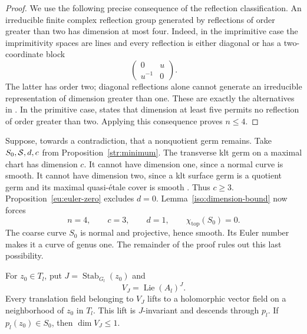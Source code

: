 \begin{proof}
We use the following precise consequence of the reflection
classification.  An irreducible finite complex reflection group
generated by reflections of order greater than two has dimension
at most four.  Indeed, in the imprimitive case the imprimitivity
spaces are lines and every reflection is either diagonal or has
a two-coordinate block
\[
                       \begin{pmatrix}0&u\\u^{-1}&0\end{pmatrix}.
\]
The latter has order two; diagonal reflections alone cannot generate
an irreducible representation of dimension greater than one.
These are exactly the alternatives in
\cite[\S2, pp.~276--277]{ShephardTodd1954}.
In the primitive case,
\cite[Proposition~(5.9)(iii), p.~430]{Cohen1976}
states that dimension at least five permits no reflection of
order greater than two.  Applying this consequence proves \(n\le4\).
\end{proof}

Suppose, towards a contradiction, that a nonquotient germ remains.
Take \(S_0,\mathcal S,d,c\) from Proposition~\ref{str:minimum}.
The transverse klt germ on a maximal chart has dimension \(c\).
It cannot have dimension one, since a normal curve is smooth.
It cannot have dimension two, since a klt surface germ is a quotient
germ and its maximal quasi-\'etale cover is smooth
\cite[Proposition~(6.11)]{ClemensKollarMori1988}.
Thus \(c\ge3\).
Proposition~\ref{eu:euler-zero} excludes \(d=0\).
Lemma~\ref{iso:dimension-bound} now forces
\begin{equation}\label{iso:elliptic-case}
              n=4,\qquad c=3,\qquad d=1,\qquad
              \chi_{\mathrm{top}}(S_0)=0.
\end{equation}
The coarse curve \(S_0\) is normal and projective, hence smooth.
Its Euler number makes it a curve of genus one.
The remainder of the proof rules out this last possibility.

\begin{lemma}\label{iso:local-fields}
For \(z_0\in T_l\), put \(J=\operatorname{Stab}_{G_l}(z_0)\) and
\[
                V_J=\operatorname{Lie}(A_l)^J.
\]
Every translation field belonging to \(V_J\) lifts to a holomorphic
vector field on a neighborhood of \(z_0\) in \(T_l\).  This lift is
\(J\)-invariant and descends through \(p_l\).
If \(p_l(z_0)\in S_0\), then \(\dim V_J\le1\).
\end{lemma}


